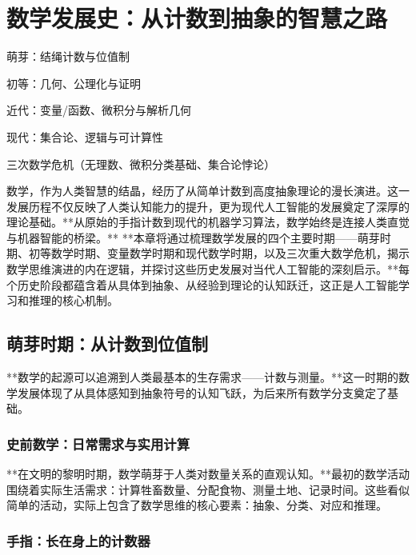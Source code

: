\chapter{数学发展史：从计数到抽象的智慧之路}

\begin{introduction}
\item 萌芽：结绳计数与位值制


\item 初等：几何、公理化与证明
\item 近代：变量/函数、微积分与解析几何
\item 现代：集合论、逻辑与可计算性
\item 三次数学危机（无理数、微积分类基础、集合论悖论）
\end{introduction}

数学，作为人类智慧的结晶，经历了从简单计数到高度抽象理论的漫长演进。这一发展历程不仅反映了人类认知能力的提升，更为现代人工智能的发展奠定了深厚的理论基础。**从原始的手指计数到现代的机器学习算法，数学始终是连接人类直觉与机器智能的桥梁。**
**本章将通过梳理数学发展的四个主要时期——萌芽时期、初等数学时期、变量数学时期和现代数学时期，以及三次重大数学危机，揭示数学思维演进的内在逻辑，并探讨这些历史发展对当代人工智能的深刻启示。**每个历史阶段都蕴含着从具体到抽象、从经验到理论的认知跃迁，这正是人工智能学习和推理的核心机制。

\section{萌芽时期：从计数到位值制}

**数学的起源可以追溯到人类最基本的生存需求——计数与测量。**这一时期的数学发展体现了从具体感知到抽象符号的认知飞跃，为后来所有数学分支奠定了基础。

\subsection{史前数学：日常需求与实用计算}

**在文明的黎明时期，数学萌芽于人类对数量关系的直观认知。**最初的数学活动围绕着实际生活需求：计算牲畜数量、分配食物、测量土地、记录时间。这些看似简单的活动，实际上包含了数学思维的核心要素：抽象、分类、对应和推理。

\subsection{手指：长在身上的计数器}

